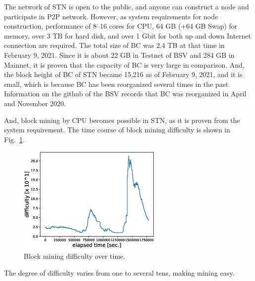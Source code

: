 \documentclass[graybox]{svmult}
\begin{document}
The network of STN is open to the public, and anyone can construct a node and participate in P2P network.
However, as system requirements for node construction, performance of 8--16 cores for CPU, 64 GB (+64 GB Swap) for memory, over 3 TB for hard disk, and over 1 Gbit for both up and down Internet connection are required.
The total size of BC was 2.4 TB at that time in February 9, 2021.
Since it is about 22 GB in Testnet of BSV and 284 GB in Mainnet, it is proven that the capacity of BC is very large in comparison.
And, the block height of BC of STN became 15,216 as of February 9, 2021, and it is small, which is because BC has been reorganized several times in the past.
Information on the github of the BSV records that BC was reorganized in April and November 2020. 



And, block mining by CPU becomes possible in STN, as it is proven from the system requirement.
The time course of block mining difficulty is shown in Fig.~\ref{fig:difficulty}.
%
\begin{figure}[t]
  \vspace{-35mm}
  \begin{center}
    \includegraphics[width=70mm]{time_vs_difficulty-plot.eps}
  \end{center}
  \vspace{35mm}
  \caption{Block mining difficulty over time.}
  \label{fig:difficulty}
\end{figure}
%
The degree of difficulty varies from one to several tens, making mining easy.
\end{document}
